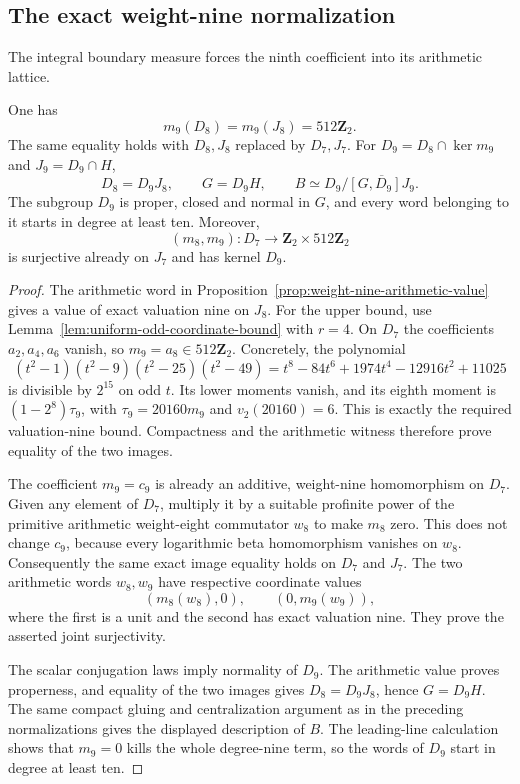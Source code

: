 \subsection{The exact weight-nine normalization}
\label{subsec:weight-nine-exact}

The integral boundary measure forces the ninth coefficient into
its arithmetic lattice.

\begin{theorem}\label{thm:weight-nine-exact-image}
One has
\[
 m_9(D_8)=m_9(J_8)=512\mathbf Z_2.
\]
The same equality holds with $D_8,J_8$ replaced by $D_7,J_7$.
For $D_9=D_8\cap\ker m_9$ and $J_9=D_9\cap H$,
\[
 D_8=D_9J_8,\qquad G=D_9H,\qquad
 B\simeq D_9/\overline{[G,D_9]J_9}.
\]
The subgroup $D_9$ is proper, closed and normal in $G$, and every
word belonging to it starts in degree at least ten. Moreover,
\[
 (m_8,m_9):D_7\longrightarrow\mathbf Z_2\times512\mathbf Z_2
\]
is surjective already on $J_7$ and has kernel $D_9$.
\end{theorem}

\begin{proof}
The arithmetic word in Proposition~\ref{prop:weight-nine-arithmetic-value}
gives a value of exact valuation nine on $J_8$.
For the upper bound, use Lemma~\ref{lem:uniform-odd-coordinate-bound}
with $r=4$. On $D_7$ the coefficients $a_2,a_4,a_6$ vanish, so
$m_9=a_8\in512\mathbf Z_2$. Concretely, the polynomial
\[
 (t^2-1)(t^2-9)(t^2-25)(t^2-49)
 =t^8-84t^6+1974t^4-12916t^2+11025
\]
is divisible by $2^{15}$ on odd $t$. Its lower moments vanish,
and its eighth moment is $(1-2^8)\tau_9$, with
$\tau_9=20160m_9$ and $v_2(20160)=6$. This is exactly the required
valuation-nine bound. Compactness and the arithmetic witness
therefore prove equality of the two images.

The coefficient $m_9=c_9$ is already an additive, weight-nine
homomorphism on $D_7$. Given any element of $D_7$, multiply it by
a suitable profinite power of the primitive arithmetic
weight-eight commutator $w_8$ to make $m_8$ zero. This does not
change $c_9$, because every logarithmic beta homomorphism vanishes
on $w_8$. Consequently the same exact image equality holds on
$D_7$ and $J_7$. The two arithmetic words $w_8,w_9$ have respective
coordinate values
\[
 (m_8(w_8),0),\qquad(0,m_9(w_9)),
\]
where the first is a unit and the second has exact valuation
nine. They prove the asserted joint surjectivity.

The scalar conjugation laws imply normality of $D_9$. The
arithmetic value proves properness, and equality of the two images
gives $D_8=D_9J_8$, hence $G=D_9H$. The same compact gluing and
centralization argument as in the preceding normalizations gives
the displayed description of $B$. The leading-line calculation
shows that $m_9=0$ kills the whole degree-nine term, so the words
of $D_9$ start in degree at least ten.
\end{proof}

